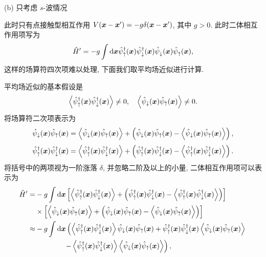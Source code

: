 (b) 只考虑 $s$-波情况 

此时只有点接触型相互作用 $V(\boldsymbol{x}-\boldsymbol{x}')=-g\delta(\boldsymbol{x}-\boldsymbol{x}')$, 其中 $g>0$. 此时二体相互作用项写为  
\begin{equation}
    \hat{H}'=-g\int\mathrm{d}\boldsymbol{x}\hat{\psi}_\uparrow^\dagger(\boldsymbol{x})\hat\psi_\downarrow^\dagger(\boldsymbol{x})\hat{\psi}_\downarrow^{ }(\boldsymbol{x})\hat{\psi}_{\uparrow}^{ }(\boldsymbol{x}),
\end{equation}
这样的场算符四次项难以处理, 下面我们取平均场近似进行计算.

平均场近似的基本假设是 
\begin{equation}
    \left\langle \hat{\psi}_\uparrow^\dagger(\boldsymbol{x})\hat\psi_\downarrow^\dagger(\boldsymbol{x}) \right\rangle\ne 0,\quad \left\langle \hat\psi_\downarrow(\boldsymbol{x})\hat\psi_\uparrow(\boldsymbol{x}) \right\rangle\ne 0.
\end{equation}
将场算符二次项表示为 
\begin{equation}
    \hat{\psi}_{\downarrow}(\boldsymbol{x}) \hat{\psi}_{\uparrow}(\boldsymbol{x})=\left\langle\hat{\psi}_{\downarrow}(\boldsymbol{x}) \hat{\psi}_{\uparrow}(\boldsymbol{x})\right\rangle+\left(\hat{\psi}_{\downarrow}(\boldsymbol{x}) \hat{\psi}_{\uparrow}(\boldsymbol{x})-\left\langle\hat{\psi}_{\downarrow}(\boldsymbol{x}) \hat{\psi}_{\uparrow}(\boldsymbol{x})\right\rangle\right),
\end{equation}
\begin{equation}
    \hat{\psi}_{\uparrow}^\dagger(\boldsymbol{x}) \hat{\psi}_{\downarrow}^\dagger(\boldsymbol{x}) =\left\langle\hat{\psi}_{\uparrow}^\dagger(\boldsymbol{x}) \hat{\psi}_{\downarrow}^\dagger(\boldsymbol{x})\right\rangle+\left(\hat{\psi}_{\uparrow}^\dagger(\boldsymbol{x}) \hat{\psi}_{\downarrow}^\dagger(\boldsymbol{x})-\left\langle\hat{\psi}_{\uparrow}^\dagger(\boldsymbol{x}) \hat{\psi}_{\downarrow}^\dagger(\boldsymbol{x})\right\rangle\right) .
\end{equation}
将括号中的两项视为一阶涨落 $\delta$, 并忽略二阶及以上的小量, 二体相互作用项可以表示为
 \begin{align}
        \hat{H}'= & -g \int \mathrm{d} \boldsymbol{x}\left[\left\langle\hat{\psi}_{\uparrow}^\dagger(\boldsymbol{x}) \hat{\psi}_{\downarrow}^\dagger(\boldsymbol{x})\right\rangle+\left(\hat{\psi}_{\uparrow}^\dagger(\boldsymbol{x}) \hat{\psi}_{\downarrow}^\dagger(\boldsymbol{x})-\left\langle\hat{\psi}_{\uparrow}^\dagger(\boldsymbol{x}) \hat{\psi}_{\downarrow}^\dagger(\boldsymbol{x})\right\rangle\right)\right]\nonumber \\
        & \times{\left[\left\langle\hat{\psi}_{\downarrow}(\boldsymbol{x}) \hat{\psi}_{\uparrow}(\boldsymbol{x})\right\rangle+\left(\hat{\psi}_{\downarrow}(\boldsymbol{x}) \hat{\psi}_{\uparrow}(\boldsymbol{x})-\left\langle\hat{\psi}_{\downarrow}(\boldsymbol{x}) \hat{\psi}_{\uparrow}(\boldsymbol{x})\right\rangle\right)\right] } \nonumber\\
        \approx & -g \int \mathrm{d} \boldsymbol{x}\left(\left\langle\hat{\psi}_{\uparrow}^\dagger(\boldsymbol{x}) \hat{\psi}_{\downarrow}^\dagger(\boldsymbol{x})\right\rangle \hat{\psi}_{\downarrow}(\boldsymbol{x}) \hat{\psi}_{\uparrow}(\boldsymbol{x})+\hat{\psi}_{\uparrow}^\dagger(\boldsymbol{x}) \hat{\psi}_{\downarrow}^\dagger(\boldsymbol{x})\left\langle\hat{\psi}_{\downarrow}(\boldsymbol{x}) \hat{\psi}_{\uparrow}(\boldsymbol{x})\right\rangle\right.\nonumber\\
        &\qquad\qquad\left.-\left\langle\hat{\psi}_{\uparrow}^\dagger(\boldsymbol{x}) \hat{\psi}_{\downarrow}^\dagger(\boldsymbol{x})\right\rangle\left\langle\hat{\psi}_{\downarrow}(\boldsymbol{x}) \hat{\psi}_{\uparrow}(\boldsymbol{x})\right\rangle\right),
        \end{align}
